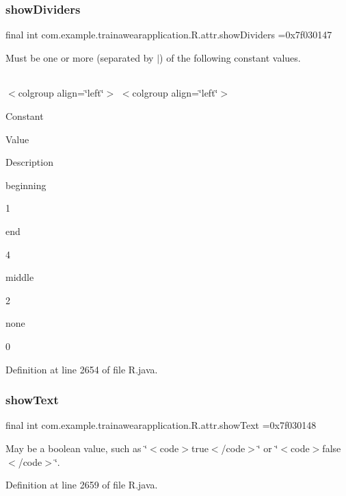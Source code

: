 \subsubsection{\texorpdfstring{showDividers}{showDividers}}
{\footnotesize\ttfamily final int com.\+example.\+trainawearapplication.\+R.\+attr.\+show\+Dividers =0x7f030147\hspace{0.3cm}{\ttfamily [static]}}

Must be one or more (separated by \textquotesingle{}$\vert$\textquotesingle{}) of the following constant values.

\tabulinesep=1mm
\begin{longtabu}spread 0pt [c]{*{0}{|X[-1]}|}
\hline
\end{longtabu}
$<$colgroup align=\char`\"{}left\char`\"{}$>$ $<$colgroup align=\char`\"{}left\char`\"{}$>$ 

Constant

Value

Description 

beginning

1

end

4

middle

2

none

0

Definition at line 2654 of file R.\+java.

\mbox{\label{classcom_1_1example_1_1trainawearapplication_1_1_r_1_1attr_a59d162a5b1a1a60fc12760ca66de6ef0}} 
\subsubsection{\texorpdfstring{showText}{showText}}
{\footnotesize\ttfamily final int com.\+example.\+trainawearapplication.\+R.\+attr.\+show\+Text =0x7f030148\hspace{0.3cm}{\ttfamily [static]}}

May be a boolean value, such as \char`\"{}$<$code$>$true$<$/code$>$\char`\"{} or \char`\"{}$<$code$>$false$<$/code$>$\char`\"{}. 

Definition at line 2659 of file R.\+java.

